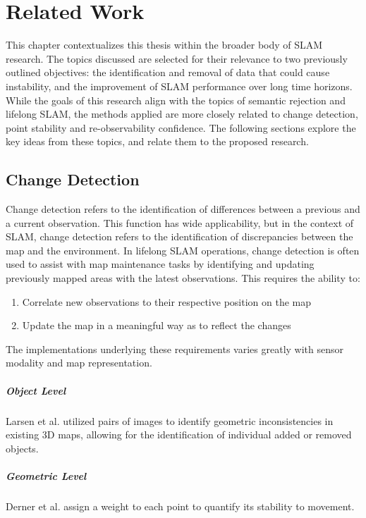 \section{Related Work}
\label{sec:related_work}

This chapter contextualizes this thesis within the broader body of SLAM research. The topics discussed are selected for their relevance to two previously outlined objectives: the identification and removal of data that could cause instability, and the improvement of SLAM performance over long time horizons. While the goals of this research align with the topics of semantic rejection and lifelong SLAM, the methods applied are more closely related to change detection, point stability and re-observability confidence. The following sections explore the key ideas from these topics, and relate them to the proposed research.

\subsection{Change Detection}

Change detection refers to the identification of differences between a previous and a current observation. This function has wide applicability, but in the context of SLAM, change detection refers to the identification of discrepancies between the map and the environment. In lifelong SLAM operations, change detection is often used to assist with map maintenance tasks by identifying and updating previously mapped areas with the latest observations. This requires the ability to:
\begin{enumerate}
    \item Correlate new observations to their respective position on the map
    \item Update the map in a meaningful way as to reflect the changes
\end{enumerate}
The implementations underlying these requirements varies greatly with sensor modality and map representation.


\subparagraph{Object Level}
Larsen et al. \cite{larsenChangeDetectionModel} utilized pairs of images to identify geometric inconsistencies in existing 3D maps, allowing for the identification of individual added or removed objects.

\subparagraph{Geometric Level}
Derner et al. \cite{dernerChangeDetectionUsing2021} assign a weight to each point to quantify its stability to movement.




